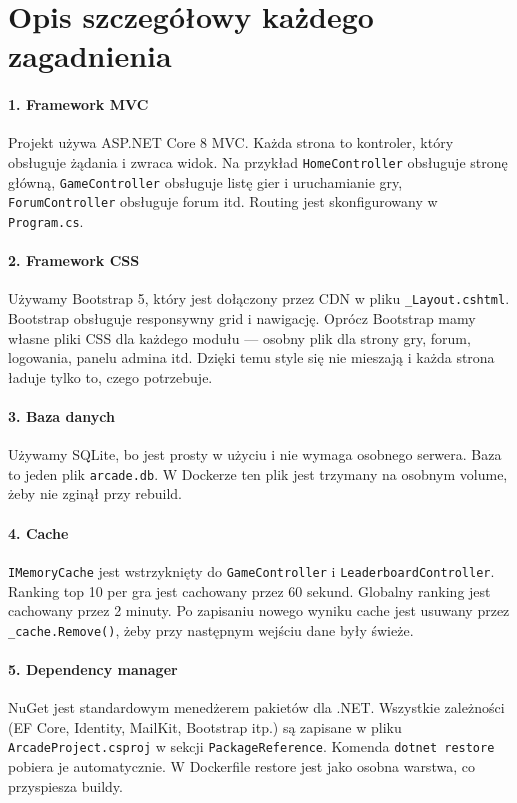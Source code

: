 \documentclass[12pt,a4paper]{article}
\newcommand{\code}[1]{\texttt{\small#1}}
\begin{document}
\section*{Opis szczegółowy każdego zagadnienia}

\paragraph{1. Framework MVC}
Projekt używa ASP.NET Core 8 MVC. Każda strona to kontroler, który obsługuje żądania i zwraca widok.
Na przykład \code{HomeController} obsługuje stronę główną, \code{GameController} obsługuje listę gier
i uruchamianie gry, \code{ForumController} obsługuje forum itd. Routing jest skonfigurowany w \code{Program.cs}.

\paragraph{2. Framework CSS}
Używamy Bootstrap 5, który jest dołączony przez CDN w pliku \code{\_Layout.cshtml}. Bootstrap obsługuje
responsywny grid i nawigację. Oprócz Bootstrap mamy własne pliki CSS dla każdego modułu --- osobny plik
dla strony gry, forum, logowania, panelu admina itd. Dzięki temu style się nie mieszają i każda strona
ładuje tylko to, czego potrzebuje.

\paragraph{3. Baza danych}
Używamy SQLite, bo jest prosty w użyciu i nie wymaga osobnego serwera. Baza to jeden plik \code{arcade.db}.
W Dockerze ten plik jest trzymany na osobnym volume, żeby nie zginął przy rebuild.

\paragraph{4. Cache}
\code{IMemoryCache} jest wstrzyknięty do \code{GameController} i \code{LeaderboardController}. Ranking
top 10 per gra jest cachowany przez 60 sekund. Globalny ranking jest cachowany przez 2 minuty. Po zapisaniu
nowego wyniku cache jest usuwany przez \code{\_cache.Remove()}, żeby przy następnym wejściu dane były świeże.

\paragraph{5. Dependency manager}
NuGet jest standardowym menedżerem pakietów dla .NET. Wszystkie zależności (EF Core, Identity, MailKit,
Bootstrap itp.) są zapisane w pliku \code{ArcadeProject.csproj} w sekcji \code{PackageReference}. Komenda
\code{dotnet restore} pobiera je automatycznie. W Dockerfile restore jest jako osobna warstwa, co przyspiesza buildy.
\end{document}
